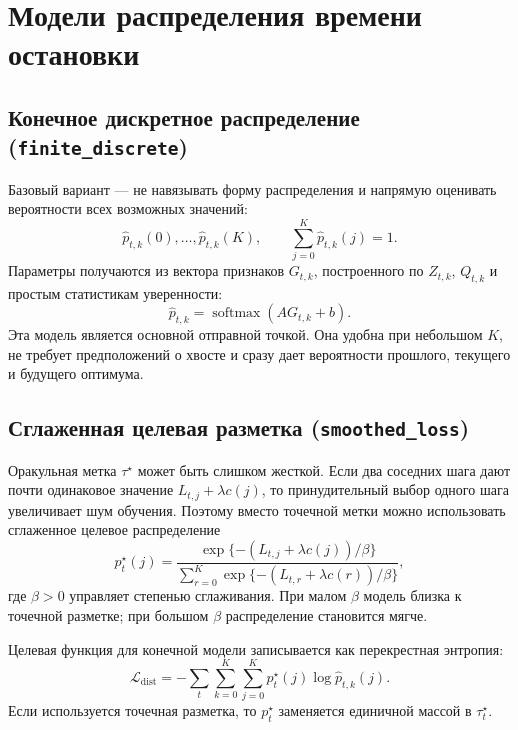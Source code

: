 \section{Модели распределения времени остановки}\label{sec:dist_families}

\subsection{Конечное дискретное распределение (\texttt{finite\_discrete})}

Базовый вариант --- не навязывать форму распределения и напрямую оценивать вероятности всех
возможных значений:
\begin{equation}
  \widehat p_{t,k}(0),\ldots,\widehat p_{t,k}(K),
  \qquad
  \sum_{j=0}^{K}\widehat p_{t,k}(j)=1.
  \label{eq:finite_distribution}
\end{equation}
Параметры получаются из вектора признаков \(G_{t,k}\), построенного по \(Z_{t,k}\), \(Q_{t,k}\) и
простым статистикам уверенности:
\begin{equation}
  \widehat p_{t,k}=\operatorname{softmax}(A G_{t,k}+b).
  \label{eq:finite_head}
\end{equation}
Эта модель является основной отправной точкой. Она удобна при небольшом \(K\), не требует
предположений о хвосте и сразу дает вероятности прошлого, текущего и будущего оптимума.

\subsection{Сглаженная целевая разметка (\texttt{smoothed\_loss})}

Оракульная метка \(\tau^\star\) может быть слишком жесткой. Если два соседних шага дают почти
одинаковое значение \(L_{t,j}+\lambda c(j)\), то принудительный выбор одного шага увеличивает шум
обучения. Поэтому вместо точечной метки можно использовать сглаженное целевое распределение
\begin{equation}
  p^\star_{t}(j)=
  \frac{\exp\{-(L_{t,j}+\lambda c(j))/\beta\}}
  {\sum_{r=0}^{K}\exp\{-(L_{t,r}+\lambda c(r))/\beta\}},
  \label{eq:smoothed_target}
\end{equation}
где \(\beta>0\) управляет степенью сглаживания. При малом \(\beta\) модель близка к точечной
разметке; при большом \(\beta\) распределение становится мягче.

Целевая функция для конечной модели записывается как перекрестная энтропия:
\begin{equation}
  \mathcal L_{\mathrm{dist}}=-\sum_{t}\sum_{k=0}^{K}\sum_{j=0}^{K}
  p^\star_t(j)\log \widehat p_{t,k}(j).
  \label{eq:distribution_loss}
\end{equation}
Если используется точечная разметка, то \(p^\star_t\) заменяется единичной массой в
\(\tau_t^\star\).

